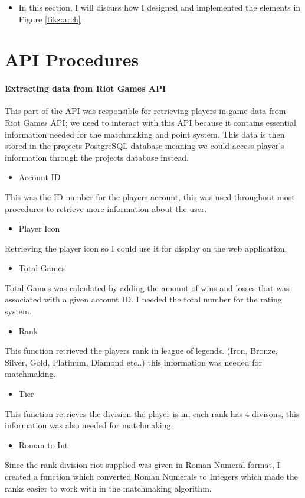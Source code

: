 \begin{itemize}
	\item In this section, I will discuss how I designed and implemented the elements in Figure \ref{tikz:arch}
\end{itemize}

\newpage
\section{API Procedures}

\paragraph{Extracting data from Riot Games API}
This part of the API was responsible for retrieving players in-game data from Riot Games API; we need to interact with this API because it contains essential information needed for the matchmaking and point system. This data is then stored in the projects PostgreSQL database meaning we could access player's information through the projects database instead.
\begin{itemize}
	\item Account ID
\end{itemize}
This was the ID number for the players account, this was used throughout most procedures to retrieve more information about the user.
\begin{itemize}
	\item Player Icon
\end{itemize}
Retrieving the player icon so I could use it for display on the web application.
\begin{itemize}
	\item Total Games
\end{itemize}
Total Games was calculated by adding the amount of wins and losses that was associated with a given account ID. I needed the total number for the rating system.
\begin{itemize}
	\item Rank
\end{itemize}
This function retrieved the players rank in league of legends.
(Iron, Bronze, Silver, Gold, Platinum, Diamond etc..) this information was needed for matchmaking.
\begin{itemize}
	\item Tier
\end{itemize}
This function retrieves the division the player is in, each rank has 4 divisons, this information was also needed for matchmaking.
\begin{itemize}
	\item Roman to Int
\end{itemize}
Since the rank division riot supplied was given in Roman Numeral format, I created a function which converted Roman Numerals to Integers which made the ranks easier to work with in the matchmaking algorithm.

